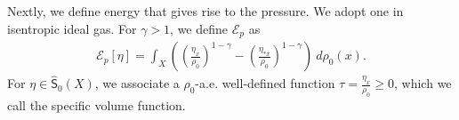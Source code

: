 \documentclass[10pt, letterpaper]{article}
\def\red{\color{red}}
\def\S{{\textsf{S}}}
\def\E{{\mathcal{E}}}
\theoremstyle{definition}
\theoremstyle{remark}
\begin{document}
% 
% 
% 
% 
Nextly, we define energy that gives rise to the pressure. We adopt one in isentropic ideal gas. For $\gamma>1$, we define $\E_p$ as
\begin{align} \label{Ep}
 \E_{p}[\eta] = \int_X \left(\left(\frac{\eta_x}{\rho_0}\right)^{1-\gamma}  - \left(\frac{\eta_{*x}}{\rho_0}\right)^{1-\gamma}\right)\: d\rho_0(x).%
\end{align}
For $\eta\in \hat{\textsf{S}}_0(X)$, we associate a $\rho_0$-a.e. well-defined function $\tau = \frac{\eta_x}{\rho_0}\ge 0$, which we call the specific volume function.

\end{document}
